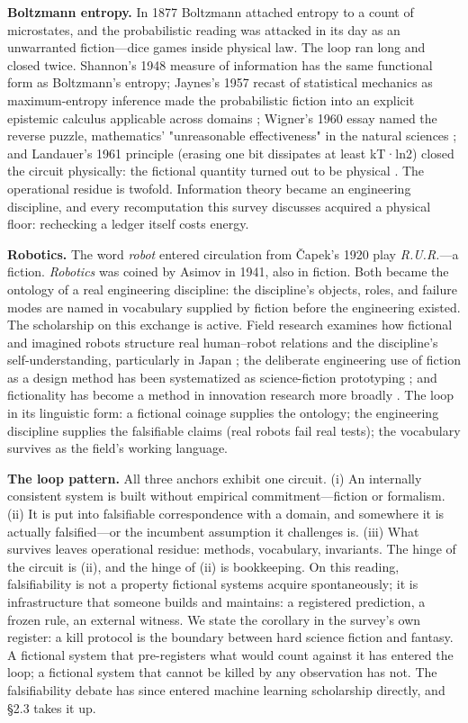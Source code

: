 \documentclass[11pt,a4paper]{article}
\begin{document}
\textbf{Boltzmann entropy.} In 1877 Boltzmann attached entropy to a count of microstates, and the probabilistic reading was attacked in its day as an unwarranted fiction—dice games inside physical law. The loop ran long and closed twice. Shannon's 1948 measure of information has the same functional form as Boltzmann's entropy; Jaynes's 1957 recast of statistical mechanics as maximum-entropy inference made the probabilistic fiction into an explicit epistemic calculus applicable across domains \cite{key19}; Wigner's 1960 essay named the reverse puzzle, mathematics' "unreasonable effectiveness" in the natural sciences \cite{key20}; and Landauer's 1961 principle (erasing one bit dissipates at least kT·ln2) closed the circuit physically: the fictional quantity turned out to be physical \cite{key21}. The operational residue is twofold. Information theory became an engineering discipline, and every recomputation this survey discusses acquired a physical floor: rechecking a ledger itself costs energy.

\textbf{Robotics.} The word \textit{robot} entered circulation from Čapek's 1920 play \textit{R.U.R.}—a fiction. \textit{Robotics} was coined by Asimov in 1941, also in fiction. Both became the ontology of a real engineering discipline: the discipline's objects, roles, and failure modes are named in vocabulary supplied by fiction before the engineering existed. The scholarship on this exchange is active. Field research examines how fictional and imagined robots structure real human–robot relations and the discipline's self-understanding, particularly in Japan \cite{key22}; the deliberate engineering use of fiction as a design method has been systematized as science-fiction prototyping \cite{key23}; and fictionality has become a method in innovation research more broadly \cite{key24}. The loop in its linguistic form: a fictional coinage supplies the ontology; the engineering discipline supplies the falsifiable claims (real robots fail real tests); the vocabulary survives as the field's working language.

\textbf{The loop pattern.} All three anchors exhibit one circuit. (i) An internally consistent system is built without empirical commitment—fiction or formalism. (ii) It is put into falsifiable correspondence with a domain, and somewhere it is actually falsified—or the incumbent assumption it challenges is. (iii) What survives leaves operational residue: methods, vocabulary, invariants. The hinge of the circuit is (ii), and the hinge of (ii) is bookkeeping. On this reading, falsifiability is not a property fictional systems acquire spontaneously; it is infrastructure that someone builds and maintains: a registered prediction, a frozen rule, an external witness. We state the corollary in the survey's own register: a kill protocol is the boundary between hard science fiction and fantasy. A fictional system that pre-registers what would count against it has entered the loop; a fictional system that cannot be killed by any observation has not. The falsifiability debate has since entered machine learning scholarship directly, and §2.3 takes it up.
\end{document}
